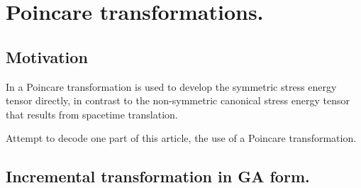 
%
%
%




\chapter{Poincare transformations.}
\label{chap:poincareTx}
\date{ June 1, 2009.  $RCSfile: poincareTx.tex,v $ Last $Revision: 1.8 $ $Date: 2009/07/09 02:53:25 $ }

%

\section{Motivation}

In \cite{montesinos2006sem} a Poincare transformation is used to develop the symmetric stress energy tensor directly, in contrast to the non-symmetric canonical stress energy tensor that results from spacetime translation.

Attempt to decode one part of this article, the use of a Poincare transformation.

\section{Incremental transformation in GA form.}


